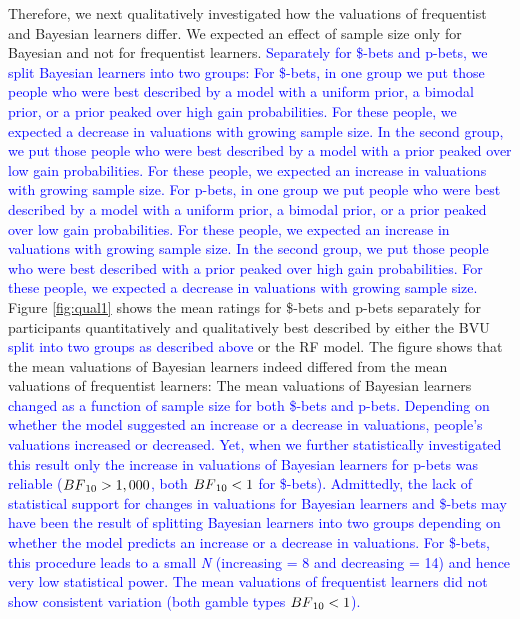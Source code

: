\documentclass[a4paper, man, natbib, floatsintext]{apa6} %
\begin{document}
Therefore, we next qualitatively investigated how the valuations of frequentist and Bayesian learners differ. We expected an effect of sample size only for Bayesian and not for frequentist learners. \textcolor{blue}{Separately for \$-bets and p-bets, we split Bayesian learners into two groups: For \$-bets, in one group we put those people who were best described by a model with a uniform prior, a bimodal prior, or a prior peaked over high gain probabilities. For these people, we expected a decrease in valuations with growing sample size. In the second group, we put those people who were best described by a model with a prior peaked over low gain probabilities. For these people, we expected an increase in valuations with growing sample size. For p-bets, in one group we put people who were best described by a model with a uniform prior, a bimodal prior, or a prior peaked over low gain probabilities. For these people, we expected an increase in valuations with growing sample size. In the second group, we put those people who were best described with a prior peaked over high gain probabilities. For these people, we expected a decrease in valuations with growing sample size.}  
Figure \ref{fig:qual1} shows the mean ratings for \$-bets and p-bets separately for participants quantitatively and qualitatively best described by either the BVU \textcolor{blue}{split into two groups as described above} or the RF model. The figure shows that the mean valuations of Bayesian learners indeed differed from the mean valuations of frequentist learners: The mean valuations of Bayesian learners \textcolor{blue}{changed as a function of sample size for both \$-bets and p-bets. Depending on whether the model suggested an increase or a decrease in valuations, people's valuations increased or decreased.
Yet, when we further statistically investigated this result only the increase in valuations of Bayesian learners for p-bets was reliable ($BF\textsubscript{10} > 1,000$, both $BF\textsubscript{10} < 1$ for \$-bets). Admittedly, the lack of statistical support for changes in valuations for Bayesian learners and \$-bets may have been the result of splitting Bayesian learners into two groups depending on whether the model predicts an increase or a decrease in valuations. For \$-bets, this procedure leads to a small \textit{N} (increasing = 8 and decreasing = 14) and hence very low statistical power. The mean valuations of frequentist learners did not show consistent variation (both gamble types $BF\textsubscript{10} < 1$).}
\end{document}
